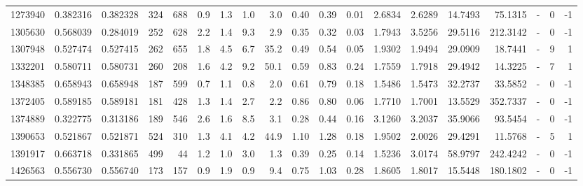 \begin{tabular}{rrrrrrrrrrrrrrrrlrr}
   1273940 & 0.382316 &   0.382328 &  324 &  688 &      0.9 &      1.3 &     1.0 &      3.0 &       0.40 &        0.39 &        0.01 &  2.6834 &  2.6289 &   14.7493 &   75.1315 &             - &        0 &         -1 \\
   1305630 & 0.568039 &   0.284019 &  252 &  628 &      2.2 &      1.4 &     9.3 &      2.9 &       0.35 &        0.32 &        0.03 &  1.7943 &  3.5256 &   29.5116 &  212.3142 &             - &        0 &         -1 \\
   1307948 & 0.527474 &   0.527415 &  262 &  655 &      1.8 &      4.5 &     6.7 &     35.2 &       0.49 &        0.54 &        0.05 &  1.9302 &  1.9494 &   29.0909 &   18.7441 &             - &        9 &          1 \\
   1332201 & 0.580711 &   0.580731 &  260 &  208 &      1.6 &      4.2 &     9.2 &     50.1 &       0.59 &        0.83 &        0.24 &  1.7559 &  1.7918 &   29.4942 &   14.3225 &             - &        7 &          1 \\
   1348385 & 0.658943 &   0.658948 &  187 &  599 &      0.7 &      1.1 &     0.8 &      2.0 &       0.61 &        0.79 &        0.18 &  1.5486 &  1.5473 &   32.2737 &   33.5852 &             - &        0 &         -1 \\
   1372405 & 0.589185 &   0.589181 &  181 &  428 &      1.3 &      1.4 &     2.7 &      2.2 &       0.86 &        0.80 &        0.06 &  1.7710 &  1.7001 &   13.5529 &  352.7337 &             - &        0 &         -1 \\
   1374889 & 0.322775 &   0.313186 &  189 &  546 &      2.6 &      1.6 &     8.5 &      3.1 &       0.28 &        0.44 &        0.16 &  3.1260 &  3.2037 &   35.9066 &   93.5454 &             - &        0 &         -1 \\
   1390653 & 0.521867 &   0.521871 &  524 &  310 &      1.3 &      4.1 &     4.2 &     44.9 &       1.10 &        1.28 &        0.18 &  1.9502 &  2.0026 &   29.4291 &   11.5768 &             - &        5 &          1 \\
   1391917 & 0.663718 &   0.331865 &  499 &   44 &      1.2 &      1.0 &     3.0 &      1.3 &       0.39 &        0.25 &        0.14 &  1.5236 &  3.0174 &   58.9797 &  242.4242 &             - &        0 &         -1 \\
   1426563 & 0.556730 &   0.556740 &  173 &  157 &      0.9 &      1.9 &     0.9 &      9.4 &       0.75 &        1.03 &        0.28 &  1.8605 &  1.8017 &   15.5448 &  180.1802 &             - &        0 &         -1 \\

\end{tabular}

